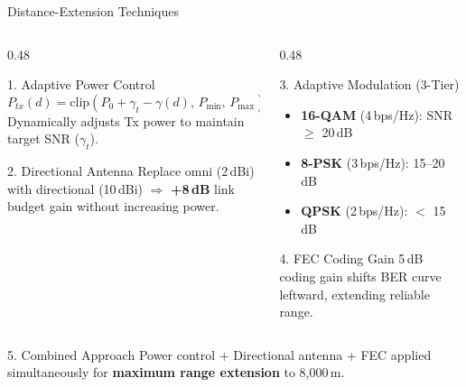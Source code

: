 \documentclass[aspectratio=169, 11pt]{beamer}
\begin{document}
\begin{frame}[shrink=5]{Distance-Extension Techniques}
\begin{columns}[T]
\begin{column}{0.48\textwidth}
\begin{block}{1. Adaptive Power Control}
{\small
\[
P_{tx}(d) = \text{clip}\!\left(P_0 + \gamma_t - \gamma(d),\, P_{\min},\, P_{\max}\right)
\]
}%
Dynamically adjusts Tx power to maintain target SNR ($\gamma_t$).
\end{block}
\begin{block}{2. Directional Antenna}
Replace omni (2\,dBi) with directional (10\,dBi) $\Rightarrow$ \textbf{+8\,dB} link budget gain without increasing power.
\end{block}
\end{column}
\begin{column}{0.48\textwidth}
\begin{block}{3. Adaptive Modulation (3-Tier)}
\begin{itemize}\setlength{\itemsep}{1pt}
  \item \textbf{16-QAM} (4\,bps/Hz): SNR $\geq$ 20\,dB
  \item \textbf{8-PSK} (3\,bps/Hz): 15--20\,dB
  \item \textbf{QPSK} (2\,bps/Hz): $<$ 15\,dB
\end{itemize}
\end{block}
\begin{block}{4. FEC Coding Gain}
5\,dB coding gain shifts BER curve leftward, extending reliable range.
\end{block}
\end{column}
\end{columns}
\vspace{0.1cm}
\begin{alertblock}{5. Combined Approach}
Power control + Directional antenna + FEC applied simultaneously for \textbf{maximum range extension} to 8,000\,m.
\end{alertblock}
\end{frame}
\end{document}
